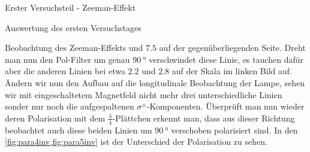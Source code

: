 \documentclass[pdftex, a4paper,11pt, twoside, ngerman]{report}
\begin{document}
\begin{chapter}{Erster Versuchsteil - Zeeman-Effekt}
\begin{section}{Auswertung des ersten Versuchstages}
\begin{subsection}{Beobachtung des Zeeman-Effekts}
        und $7.5$ auf der gegenüberliegenden Seite. Dreht man nun den Pol-Filter
        um genau $\SI{90}{\degree}$ verschwindet diese Linie, es tauchen dafür
        aber die anderen Linien bei etwa $2.2$ und $2.8$ auf der Skala im linken
        Bild auf.
        Ändern wir nun den Aufbau auf die longitudinale Beobachtung der Lampe,
        sehen wir mit eingeschaltetem Magnetfeld nicht mehr drei
        unterschiedliche Linien sonder nur noch die aufgespaltenen
        $\sigma^{\pm}$-Komponenten. Überprüft man nun wieder deren Polarisation
        mit dem $\frac{\lambda}{4}$-Plättchen erkennt man, dass aus dieser
        Richtung beobachtet auch diese beiden Linien um $\SI{90}{\degree}$
        verschoben polarisiert sind. In den \cref{fig:para4inv,fig:para5inv}
        ist der Unterschied der Polarisation zu sehen.
        
        
      \end{subsection}
      
      
      

\end{section}
\end{chapter}
\end{document}
